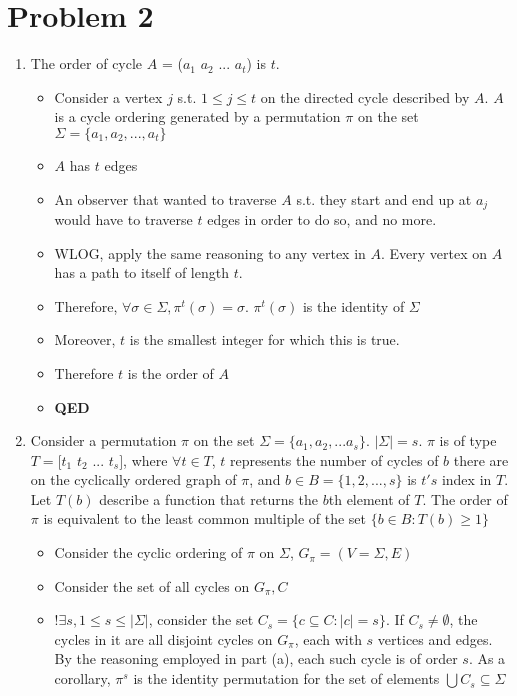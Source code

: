 \documentclass[]{article}
\begin{document}
\section{Problem 2}
\begin{enumerate}
	\item The order of cycle $A$ = ($a_1$ $a_2$ ... $a_t$) is $t$.
	\begin{itemize}
		\item Consider a vertex $j$ s.t. $1 \leq j \leq t$ on the directed cycle described by $A$. $A$ is a cycle ordering generated by a permutation $\pi$ on the set $\Sigma = \{a_1, a_2, ... , a_t\}$
		\item $A$ has $t$ edges
		\item An observer that wanted to traverse $A$ s.t. they start and end up at $a_j$ would have to traverse $t$ edges in order to do so, and no more.
		\item WLOG, apply the same reasoning to any vertex in $A$. Every vertex on $A$ has a path to itself of length $t$.
		\item Therefore, $\forall \sigma \in \Sigma, \pi^t(\sigma) = \sigma$. $\pi^t(\sigma)$ is the identity of $\Sigma$
		\item Moreover, $t$ is the smallest integer for which this is true.
		\item Therefore $t$ is the order of $A$
		\item \textbf{QED}
	\end{itemize}
	\item Consider a permutation $\pi$ on the set $\Sigma = \{a_1, a_2, ... a_s\}$. $|\Sigma| = s$. $\pi$ is of type $T = [t_1$ $t_2$ ... $t_s]$, where $\forall t \in T$, $t$ represents the number of cycles of $b$ there are on the cyclically ordered graph of $\pi$, and $b \in B = \{1,2,...,s\}$ is $t's$ index in $T$. Let $T(b)$ describe a function that returns the $b$th element of $T$. The order of $\pi$ is equivalent to the least common multiple of the set $\{b \in B : T(b) \geq 1\}$
	\begin{itemize}
		\item Consider the cyclic ordering of $\pi$ on $\Sigma$, $G_{\pi} = (V = \Sigma, E)$
		\item Consider the set of all cycles on $G_{\pi}, C$
		\item $!\exists s, 1 \leq s \leq |\Sigma|$, consider the set $C_s = \{c \subseteq C : |c| = s\}$. If $C_s \neq \emptyset$, the cycles in it are all disjoint cycles on $G_{\pi}$, each with $s$ vertices and edges. By the reasoning employed in part (a), each such cycle is of order $s$. As a corollary, $\pi^s$ is the identity permutation for the set of elements $\bigcup C_s \subseteq \Sigma$

\end{itemize}
\end{enumerate}
\end{document}
